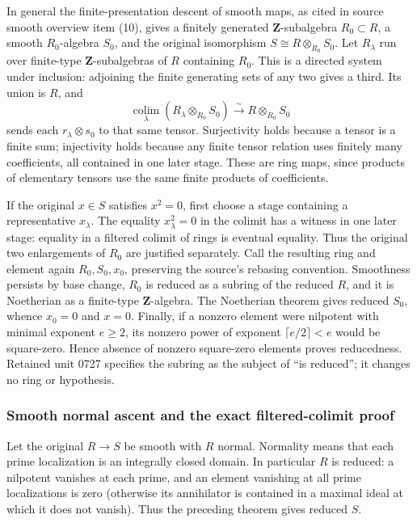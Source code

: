 In general the finite-presentation descent of smooth maps, as cited in source smooth overview item (10), gives a finitely generated \(\mathbf Z\)-subalgebra \(R_0\subset R\), a smooth \(R_0\)-algebra \(S_0\), and the original isomorphism \(S\cong R\otimes_{R_0}S_0\). Let \(R_\lambda\) run over finite-type \(\mathbf Z\)-subalgebras of \(R\) containing \(R_0\). This is a directed system under inclusion: adjoining the finite generating sets of any two gives a third. Its union is \(R\), and \[
 \underset{\lambda}{\operatorname{colim}}
 (R_\lambda\otimes_{R_0}S_0)
 \xrightarrow{\sim}R\otimes_{R_0}S_0
\] sends each \(r_\lambda\otimes s_0\) to that same tensor. Surjectivity holds because a tensor is a finite sum; injectivity holds because any finite tensor relation uses finitely many coefficients, all contained in one later stage. These are ring maps, since products of elementary tensors use the same finite products of coefficients.

If the original \(x\in S\) satisfies \(x^2=0\), first choose a stage containing a representative \(x_\lambda\). The equality \(x_\lambda^2=0\) in the colimit has a witness in one later stage: equality in a filtered colimit of rings is eventual equality. Thus the original two enlargements of \(R_0\) are justified separately. Call the resulting ring and element again \(R_0,S_0,x_0\), preserving the source's rebasing convention. Smoothness persists by base change, \(R_0\) is reduced as a subring of the reduced \(R\), and it is Noetherian as a finite-type \(\mathbf Z\)-algebra. The Noetherian theorem gives reduced \(S_0\), whence \(x_0=0\) and \(x=0\). Finally, if a nonzero element were nilpotent with minimal exponent \(e\ge2\), its nonzero power of exponent \(\lceil e/2\rceil<e\) would be square-zero. Hence absence of nonzero square-zero elements proves reducedness. Retained unit 0727 specifies the subring as the subject of ``is reduced''; it changes no ring or hypothesis.

\subsubsection{Smooth normal ascent and the exact filtered-colimit proof}\label{smooth-normal-ascent-and-the-exact-filtered-colimit-proof}

Let the original \(R\to S\) be smooth with \(R\) normal. Normality means that each prime localization is an integrally closed domain. In particular \(R\) is reduced: a nilpotent vanishes at each prime, and an element vanishing at all prime localizations is zero (otherwise its annihilator is contained in a maximal ideal at which it does not vanish). Thus the preceding theorem gives reduced \(S\).

